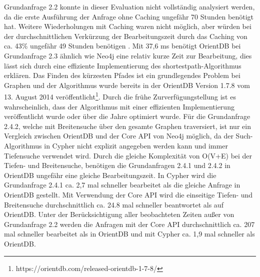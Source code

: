  Grundanfrage 2.2 konnte in dieser Evaluation nicht vollständig analysiert werden, da die erste Ausführung der Anfrage ohne Caching ungefähr 70 Stunden benötigt hat. Weitere Wiederholungen mit Caching waren nicht möglich, aber würden bei der durchschnittlichen Verkürzung der Bearbeitungszeit durch das Caching von ca. 43\%  ungefähr 49 Stunden benötigen . \newline
Mit 37,6 ms benötigt OrientDB bei Grundanfrage 2.3 ähnlich wie Neo4j eine relativ kurze Zeit zur Bearbeitung, dies lässt sich durch eine effiziente Implementierung des shortestpath-Algorithmus erklären. Das Finden des kürzesten Pfades ist ein grundlegendes Problem bei Graphen und der Algorithmus wurde bereits in der OrientDB Version 1.7.8 vom 13. August 2014 veröffentlicht\footnote{https://orientdb.com/released-orientdb-1-7-8/}. Durch die frühe Zurverfügungstellung ist es wahrscheinlich, dass der Algorithmus mit einer effizienten Implementierung veröffentlicht wurde oder über die Jahre optimiert wurde. \newline
Für die Grundanfrage 2.4.2, welche mit Breitensuche über den gesamte Graphen traversiert, ist nur ein Vergleich zwischen OrientDB und der Core API von Neo4j möglich, da der Such-Algorithmus in Cypher nicht explizit angegeben werden kann und immer Tiefensuche verwendet wird. Durch die gleiche Komplexität von O(V+E) bei der Tiefen- und Breitensuche, benötigen die Grundanfragen 2.4.1 und 2.4.2 in OrientDB ungefähr eine gleiche Bearbeitungszeit. In Cypher wird die Grundanfrage 2.4.1 ca. 2,7 mal schneller bearbeitet als die gleiche Anfrage in OrientDB gestellt. Mit Verwendung der Core API wird die einseitige Tiefen- und Breitensuche durchschnittlich ca. 24.8 mal schneller beantwortet als auf OrientDB. \newline
 Unter der Berücksichtigung aller beobachteten Zeiten außer von Grundanfrage 2.2 werden die Anfragen mit der Core API durchschnittlich ca. 207 mal schneller bearbeitet als in OrientDB und mit Cypher ca. 1,9 mal schneller als OrientDB. 
\FloatBarrier
